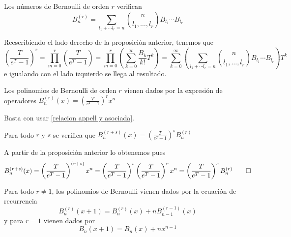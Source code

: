 \begin{proposicion}\label{bernoulli orden r en funcion de bernoullis}
    Los números de Bernoulli de orden $r$ verifican
    \begin{equation*}
    B_n^{(r)} = \sum_{l_1 + \cdots l_r = n} \binom{n}{l_1, \dots, l_r} B_{l_1} \cdots B_{l_r}
    \end{equation*}
\end{proposicion}

\begin{demo}
    Reescribiendo el lado derecho de la proposición anterior, tenemos que
    \begin{equation*}
    \left(\frac{T}{e^T - 1}\right)^r = \prod_{m=0}^r\left(\frac{T}{e^T - 1}\right) = \prod_{m=0}^r\left(\sum_{k=0}^\infty \frac{B_k}{k!} T^k\right) = \sum_{k=0}^\infty \left(\sum_{l_1 + \cdots l_r = n} \binom{n}{l_1, \dots, l_r} B_{l_1} \cdots B_{l_r}\right)T^k
    \end{equation*}
    e igualando con el lado izquierdo se llega al resultado.
\end{demo}

\begin{proposicion}\label{polinomio bernoulli operador sobre x^n}
    Los polinomios de Bernoulli de orden $r$ vienen dados por la expresión de operadores $B_n^{(r)}(x) = (\frac{T}{e^T - 1})^r x^n$
\end{proposicion}

\begin{demo}
    Basta con usar \ref{relacion appell y asociada}.
\end{demo}

\begin{proposicion}\label{bernoulli r+s en terminos de bernoulli r}
    Para todo $r$ y $s$ se verifica que $B_n^{(r+s)}(x) = (\frac{T}{e^T - 1})^s B_n^{(r)}$
\end{proposicion}

\begin{demo}
    A partir de la proposición anterior lo obtenemos pues
    \begin{equation*}
    B_n^{(r+s)}(x) = \left(\frac{T}{e^T - 1}\right)^{(r+s)} x^n = \left(\frac{T}{e^T - 1}\right)^s \left(\frac{T}{e^T - 1}\right)^r x^n = \left(\frac{T}{e^T - 1}\right)^s B_n^{(r)} \qedhere
    \end{equation*}
\end{demo}

\begin{proposicion}\label{ecuacion recurrencia bernoulli}
    Para todo $r \neq 1$, los polinomios de Bernoulli vienen dados por la ecuación de recurrencia
    \begin{equation*}
        B_n^{(r)}(x +1) = B_n^{(r)}(x) + nB_{n-1}^{(r-1)}(x)
    \end{equation*}
    y para $r = 1$ vienen dados por
    \begin{equation*}
        B_n(x+1) = B_n(x) + nx^{n-1}
    \end{equation*}
\end{proposicion}


